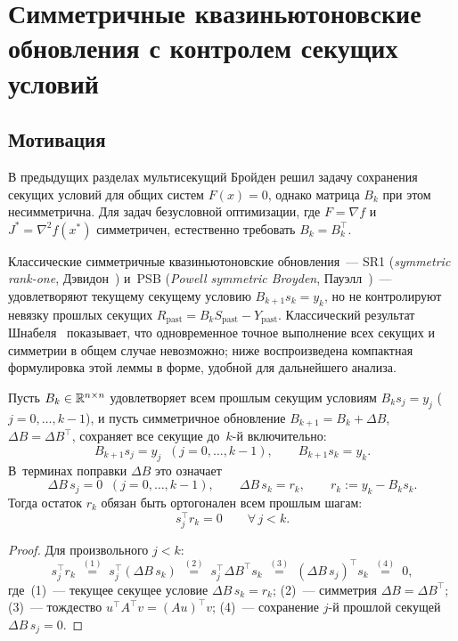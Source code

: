 \chapter{Симметричные квазиньютоновские обновления с контролем секущих условий}\label{ch:symmetric}

\section{Мотивация}\label{sec:ss_motivation}

В предыдущих разделах мультисекущий Бройден решил задачу сохранения
секущих условий для общих систем $F(x) = 0$, однако матрица $B_k$ при
этом несимметрична. Для задач безусловной оптимизации,
где $F = \nabla f$ и $J^* = \nabla^2 f(x^*)$ симметричен, естественно
требовать $B_k = B_k^\top$.

Классические симметричные квазиньютоновские обновления~---
SR1 (\emph{symmetric rank-one}, Дэвидон~\cite{davidon1991}) и~PSB
(\emph{Powell symmetric Broyden}, Пауэлл~\cite{powell1970})~---
удовлетворяют текущему секущему условию $B_{k+1} s_k = y_k$,
но не контролируют невязку прошлых секущих
$R_{\mathrm{past}} = B_k S_{\mathrm{past}} - Y_{\mathrm{past}}$.
Классический результат Шнабеля~\cite{schnabel1983} показывает,
что одновременное точное выполнение всех секущих и симметрии
в общем случае невозможно; ниже воспроизведена компактная
формулировка этой леммы в форме, удобной для дальнейшего анализа.

\begin{lemma}\label{lem:incompat}
Пусть $B_k\in\mathbb{R}^{n\times n}$ удовлетворяет всем прошлым секущим
условиям $B_k s_j = y_j$ ($j=0,\dots,k-1$), и пусть симметричное
обновление $B_{k+1} = B_k + \Delta B$, $\Delta B = \Delta B^\top$,
сохраняет все секущие до~$k$-й включительно:
\[
  B_{k+1} s_j = y_j \;\;(j = 0,\dots,k-1),
  \qquad B_{k+1} s_k = y_k.
\]
В~терминах поправки $\Delta B$ это означает
\[
  \Delta B\, s_j = 0 \;\;(j=0,\dots,k-1),
  \qquad \Delta B\, s_k = r_k,
  \qquad r_k := y_k - B_k s_k.
\]
Тогда остаток $r_k$ обязан быть ортогонален всем прошлым шагам:
\begin{equation}\label{eq:incompat}
  s_j^\top r_k = 0 \qquad \forall\, j < k.
\end{equation}
\end{lemma}

\begin{proof}
Для произвольного $j < k$:
\begin{equation}\label{eq:incompat-chain}
  s_j^\top r_k
  \;\stackrel{(1)}{=}\; s_j^\top (\Delta B\, s_k)
  \;\stackrel{(2)}{=}\; s_j^\top \Delta B^\top s_k
  \;\stackrel{(3)}{=}\; (\Delta B\, s_j)^\top s_k
  \;\stackrel{(4)}{=}\; 0,
\end{equation}
где~(1)~--- текущее секущее условие $\Delta B\, s_k = r_k$;
(2)~--- симметрия $\Delta B = \Delta B^\top$;
(3)~--- тождество $u^\top A^\top v = (A u)^\top v$;
(4)~--- сохранение $j$-й прошлой секущей $\Delta B\, s_j = 0$.
\end{proof}

